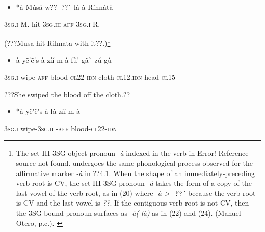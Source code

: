 \documentclass[output=paper]{langsci/langscibook}
\begin{document}
{{\begin{itemize}
\item \begin{styleNumberedEX}
\label{bkm:Ref424201687}*\`{a}    M\'{u}s\'{a}    w??\'{ }-??\`{ }-l\`{a}    \`{a}    R\'{i}hn\'{a}t\`{a}
\end{styleNumberedEX}\end{itemize}
\begin{styleGloss}
\textsc{3sg.i  }  M.    hit-\textsc{3sg.iii-aff}  \textsc{3sg.i  }  R.
\end{styleGloss}

\begin{styleTranslation}
(???Musa hit Rihnata with it??.)\footnote{ {The set III 3SG object pronoun -}{\textit{\`{a}}}{ indexed in the verb in }{Error! Reference source not found.}{ undergoes the same phonological process observed for the affirmative marker }{\textit{{}-\`{a}}}{ in ??4.1. When the shape of an immediately-preceding verb root is CV, the  set III 3SG pronoun }{\textit{{}-\`{a}}}{ takes the form of a copy of the last vowel of the verb root, as in }{(20)}{ where -}{\textit{\`{a} {\textgreater} -??\`{ }}}{ because the verb root is CV and the last vowel is}{\textit{ ??}}{. If the contiguous verb root is not CV, then the 3SG bound pronoun surfaces as -}{\textit{\`{a}(-l\`{a})}}{ as in }{(22)}{ and }{(24)}{. (Manuel Otero, p.c.).  }}
\end{styleTranslation}

\begin{itemize}
\item \begin{styleNumberedEX}
\label{bkm:Ref424201761}\`{a}    y\~{e}\'{ }\~{e}\'{ }s-\`{a}    z\'{i}\'{i}-m-\`{a}    f\~{u}\'{ }-g\~{a}\`{ }      z\'{u}-g\`{u}
\end{styleNumberedEX}\end{itemize}
\begin{styleGloss}
\textsc{3sg.i  }  wipe-\textsc{aff}  blood-\textsc{cl22-idn}  cloth-\textsc{cl12.idn}  head-\textsc{cl15}
\end{styleGloss}

\begin{styleTranslation}
???She swiped the blood off the cloth.??
\end{styleTranslation}

\begin{itemize}
\item \begin{styleNumberedEX}
\label{bkm:Ref424201769}*\`{a}    y\~{e}\'{ }\~{e}\'{ }s-\`{a}-l\`{a}    z\'{i}\'{i}-m-\`{a}
\end{styleNumberedEX}\end{itemize}
\begin{styleGloss}
\textsc{3sg.i  }  wipe-\textsc{3sg.iii-aff}  blood-\textsc{cl22-idn}
\end{styleGloss}

}}
\end{document}
